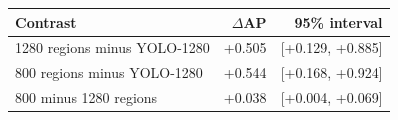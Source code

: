 \begin{tabular}{lrr}
\toprule
Contrast & $\Delta$AP & 95\% interval\\
\midrule
1280 regions minus YOLO-1280 & +0.505 & [+0.129, +0.885]\\
800 regions minus YOLO-1280 & +0.544 & [+0.168, +0.924]\\
800 minus 1280 regions & +0.038 & [+0.004, +0.069]\\
\bottomrule
\end{tabular}
